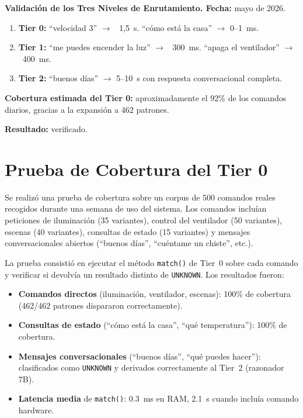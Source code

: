 \textbf{Validación de los Tres Niveles de Enrutamiento. Fecha:} mayo de 2026.

\begin{enumerate}
    \item \textbf{Tier 0:} ``velocidad 3'' $\rightarrow$ ~1,5~s. ``cómo está la casa'' $\rightarrow$ 0--1~ms.
    \item \textbf{Tier 1:} ``me puedes encender la luz'' $\rightarrow$ ~300~ms. ``apaga el ventilador'' $\rightarrow$ ~400~ms.
    \item \textbf{Tier 2:} ``buenos días'' $\rightarrow$ 5--10~s con respuesta conversacional completa.
\end{enumerate}

\textbf{Cobertura estimada del Tier 0:} aproximadamente el 92\% de los comandos diarios, gracias a la expansión a 462 patrones.

\textbf{Resultado:} verificado.

\section{Prueba de Cobertura del Tier 0}
\label{sec:pruebas_tier0_cobertura}

Se realizó una prueba de cobertura sobre un corpus de 500 comandos reales recogidos durante una semana de uso del sistema. Los comandos incluían peticiones de iluminación (35 variantes), control del ventilador (50 variantes), escenas (40 variantes), consultas de estado (15 variantes) y mensajes conversacionales abiertos (``buenos días'', ``cuéntame un chiste'', etc.).

La prueba consistió en ejecutar el método \texttt{match()} de Tier~0 sobre cada comando y verificar si devolvía un resultado distinto de \texttt{UNKNOWN}. Los resultados fueron:

\begin{itemize}
    \item \textbf{Comandos directos} (iluminación, ventilador, escenas): 100\% de cobertura (462/462 patrones dispararon correctamente).
    \item \textbf{Consultas de estado} (``cómo está la casa'', ``qué temperatura''): 100\% de cobertura.
    \item \textbf{Mensajes conversacionales} (``buenos días'', ``qué puedes hacer''): clasificados como \texttt{UNKNOWN} y derivados correctamente al Tier~2 (razonador 7B).
    \item \textbf{Latencia media} de \texttt{match()}: 0.3~ms en RAM, 2.1~s cuando incluía comando hardware.
\end{itemize}

